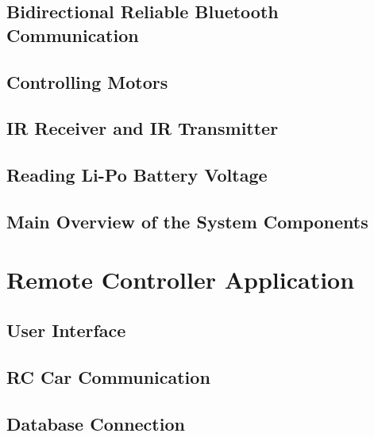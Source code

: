 \subsection{Bidirectional Reliable Bluetooth Communication} \label{sec_bluetooth_comm}

\subsection{Controlling Motors} \label{sec_controlling_motors}

\subsection{IR Receiver and IR Transmitter} \label{sec_ir_rx_tx}

\subsection{Reading Li-Po Battery Voltage} \label{sec_read_lipo_voltage}

\subsection{Main Overview of the System Components} \label{main_system_components}

\section{Remote Controller Application} \label{sec_remote_app}

\subsection{User Interface} \label{sec_user_interface}

\subsection{RC Car Communication} \label{sec_rc_comm}

\subsection{Database Connection} \label{sec_db_connection}



